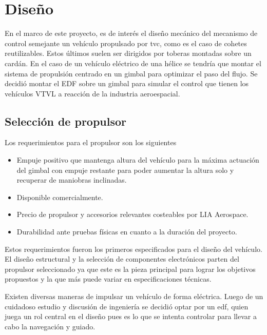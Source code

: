 \section{Diseño}

En el marco de este proyecto, es de interés el diseño mecánico del mecanismo de control semejante un vehículo propulsado por \gls{tvc}, como es el caso de cohetes reutilizables. Estos últimos suelen ser dirigidos por toberas montadas sobre un cardán. En el caso de un vehículo eléctrico de una hélice se tendría que montar el sistema de propulsión centrado en un gimbal para optimizar el paso del flujo. Se decidió montar el EDF sobre un gimbal para simular el control que tienen los vehículos VTVL a reacción de la industria aeroespacial. 



\subsection{Selección de propulsor}

Los requerimientos para el propulsor son los siguientes

\begin{itemize}
    \item Empuje positivo que mantenga altura del vehículo para la máxima actuación del gimbal con empuje restante para poder aumentar la altura solo y recuperar de maniobras inclinadas. 
    \item Disponible comercialmente.
    \item Precio de propulsor y accesorios relevantes costeables por LIA Aerospace.
    \item Durabilidad ante pruebas físicas en cuanto a la duración del proyecto.
\end{itemize}

Estos requerimientos fueron los primeros especificados para el diseño del vehículo. El diseño estructural y la selección de componentes electrónicos parten del propulsor seleccionado ya que este es la pieza principal para lograr los objetivos propuestos y la que más puede variar en especificaciones técnicas.

\medskip 

Existen diversas maneras de impulsar un vehículo de forma eléctrica. Luego de un cuidadoso estudio y discusión de ingeniería se decidió optar por un \gls{edf}, quien juega un rol central en el diseño pues es lo que se intenta controlar para llevar a cabo la navegación y guiado.


